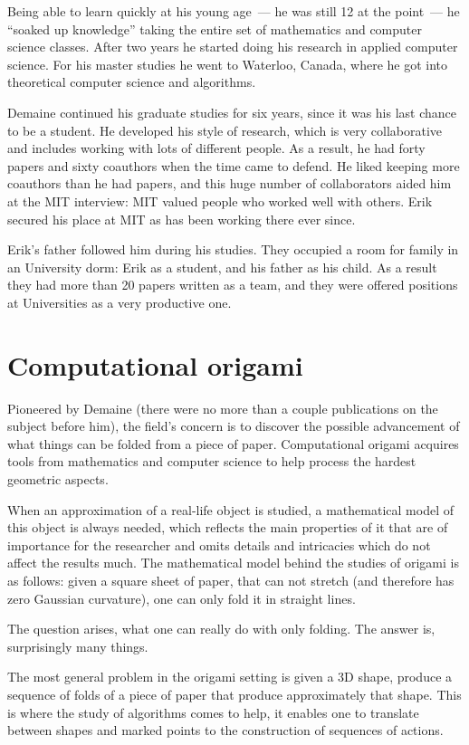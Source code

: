 \documentclass[a4paper,12pt]{article}
\begin{document}
Being able to learn quickly at his young age~— he was still 12 at the point~— he “soaked up knowledge” taking the entire set of mathematics and computer science classes. After two years he started doing his research in applied computer science. For his master studies he went to Waterloo, Canada, where he got into theoretical computer science and algorithms.

Demaine continued his graduate studies for six years, since it was his last chance to be a student. He developed his style of research, which is very collaborative and includes working with lots of different people. As a result, he had forty papers and sixty coauthors when the time came to defend. He liked keeping more coauthors than he had papers, and this huge number of collaborators aided him at the MIT interview: MIT valued people who worked well with others. Erik secured his place at MIT as has been working there ever since.

Erik's father followed him during his studies. They occupied a room for family in an University dorm: Erik as a student, and his father as his child. As a result they had more than 20 papers written as a team, and they were offered positions at Universities as a very productive one.

\section{Computational origami}

Pioneered by Demaine (there were no more than a couple publications on the subject before him), the field's concern is to discover the possible advancement of what things can be folded from a piece of paper. Computational origami acquires tools from mathematics and computer science to help process the hardest geometric aspects.

When an approximation of a real-life object is studied, a mathematical model of this object is always needed, which reflects the main properties of it that are of importance for the researcher and omits details and intricacies which do not affect the results much. The mathematical model behind the studies of origami is as follows: given a square sheet of paper, that can not stretch (and therefore has zero Gaussian curvature), one can only fold it in straight lines.

The question arises, what one can really do with only folding. The answer is, surprisingly many things.

The most general problem in the origami setting is given a 3D shape, produce a sequence of folds of a piece of paper that produce approximately that shape. This is where the study of algorithms comes to help, it enables one to translate between shapes and marked points to the construction of sequences of actions.
\end{document}
